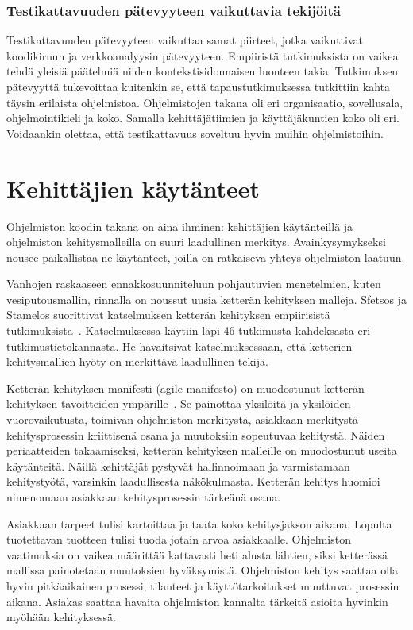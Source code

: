 \documentclass[finnish]{../tktltiki2}
\theoremstyle{definition}
\theoremstyle{remark}
\begin{document}
\subsubsection{Testikattavuuden pätevyyteen vaikuttavia tekijöitä}

Testikattavuuden pätevyyteen vaikuttaa samat piirteet, jotka vaikuttivat koodikirnun ja verkkoanalyysin pätevyyteen. 
Empiiristä tutkimuksista on vaikea tehdä yleisiä päätelmiä niiden kontekstisidonnaisen luonteen takia. Tutkimuksen 
pätevyyttä tukevoittaa kuitenkin se, että tapaustutkimuksessa tutkittiin kahta täysin erilaista ohjelmistoa. 
Ohjelmistojen takana oli eri organisaatio, sovellusala, ohjelmointikieli ja koko. Samalla kehittäjätiimien ja 
käyttäjäkuntien koko oli eri. Voidaankin olettaa, että testikattavuus soveltuu hyvin muihin ohjelmistoihin.

\section{Kehittäjien käytänteet}

Ohjelmiston koodin takana on aina ihminen: kehittäjien käytänteillä ja ohjelmiston kehitysmalleilla on suuri laadullinen 
merkitys. Avainkysymykseksi nousee paikallistaa ne käytänteet, joilla on ratkaiseva yhteys ohjelmiston laatuun.

    Vanhojen raskaaseen ennakkosuunniteluun pohjautuvien menetelmien, kuten vesiputousmallin, rinnalla on noussut uusia 
ketterän kehityksen malleja. Sfetsos ja Stamelos suorittivat katselmuksen ketterän kehityksen empiirisistä 
tutkimuksista~\cite{SS10}. Katselmuksessa käytiin läpi 46 tutkimusta kahdeksasta eri tutkimustietokannasta. He 
havaitsivat katselmuksessaan, että ketterien kehitysmallien hyöty on merkittävä laadullinen tekijä.

    Ketterän kehityksen manifesti (agile manifesto) on muodostunut ketterän kehityksen tavoitteiden 
ympärille~\cite{BBB01}. Se painottaa yksilöitä ja yksilöiden vuorovaikutusta, toimivan ohjelmiston merkitystä, asiakkaan 
merkitystä kehitysprosessin kriittisenä osana ja muutoksiin sopeutuvaa kehitystä. Näiden periaatteiden takaamiseksi, 
ketterän kehityksen malleille on muodostunut useita käytänteitä. Näillä kehittäjät pystyvät hallinnoimaan ja 
varmistamaan kehitystyötä, varsinkin laadullisesta näkökulmasta. Ketterän kehitys huomioi nimenomaan asiakkaan 
kehitysprosessin tärkeänä osana.

    Asiakkaan tarpeet tulisi kartoittaa ja taata koko kehitysjakson aikana. Lopulta tuotettavan tuotteen tulisi tuoda 
jotain arvoa asiakkaalle. Ohjelmiston vaatimuksia on vaikea määrittää kattavasti heti alusta lähtien, siksi ketterässä 
mallissa painotetaan muutoksien hyväksymistä. Ohjelmiston kehitys saattaa olla hyvin pitkäaikainen prosessi, tilanteet 
ja käyttötarkoitukset muuttuvat prosessin aikana. Asiakas saattaa havaita ohjelmiston kannalta tärkeitä asioita hyvinkin 
myöhään kehityksessä.
\end{document}
